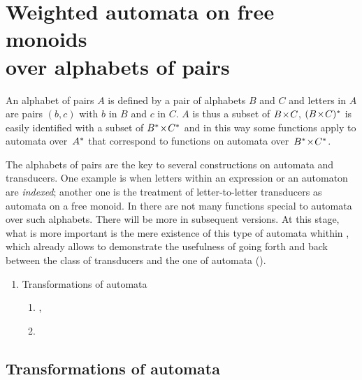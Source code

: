 

\section{Weighted automata on free monoids \protect\\
\eee over alphabets of pairs}
\label{sec:alp-pai}


An alphabet of pairs $A$ is defined by a pair of alphabets $B$ and $C$
and letters in $A$ are pairs 
$(b,c)$ with $b$ in $B$ and $c$ in $C$. $A$ is thus a subset
of $B\! \times \! C$, $(B\! \times \! C)^{*}$ is easily identified with a subset of 
${{B}^{*}}\! \times \!{{C}^{*}}$ and in this way
some functions apply to automata over~${{A}^{*}}$ that correspond to functions on
automata over~${{B}^{*}}\! \times \!{{C}^{*}}$.

The alphabets of pairs are the key to several constructions on 
automata and transducers.
One example is when letters within an expression or an automaton are 
\emph{indexed}; another one is the treatment of letter-to-letter 
transducers as automata on a free monoid.
In \tafkitv there are not many functions special to automata 
over such alphabets. 
There will be more in subsequent versions.
At this stage, what is more important is the mere existence of this 
type of automata whithin \tafkit, which already allows to demonstrate the 
usefulness of going forth and back between the class of transducers 
and the one of automata (\cf {}). 

\renewcommand{\theenumii}{\theenumi.\arabic{enumii}}

\begin{enumerate}

\item Transformations of automata

\begin{enumerate}
\item {},  
\item {}
\end{enumerate}

\end{enumerate}


\subsection{Transformations of automata}

